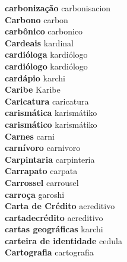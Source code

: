 \textbf{ carbonização  } carbonisacion \\
\textbf{ Carbono  } carbon \\
\textbf{ carbônico  } carbonico \\
\textbf{ Cardeais  } kardinal \\
\textbf{ cardióloga  } kardiólogo \\
\textbf{ cardiólogo  } kardiólogo \\
\textbf{ cardápio  } karchi \\
\textbf{ Caribe  } Karibe \\
\textbf{ Caricatura  } caricatura \\
\textbf{ carismática  } karismátiko \\
\textbf{ carismático  } karismátiko \\
\textbf{ Carnes  } carni \\
\textbf{ carnívoro  } carnivoro \\
\textbf{ Carpintaria  } carpinteria \\
\textbf{ Carrapato  } carpata \\
\textbf{ Carrossel  } carrousel \\
\textbf{ carroça  } garoshi \\
\textbf{ Carta de Crédito  } acreditivo \\
\textbf{ cartadecrédito  } acreditivo \\
\textbf{ cartas geográficas  } karchi \\
\textbf{ carteira de identidade  } cedula \\
\textbf{ Cartografia  } cartografia \\
